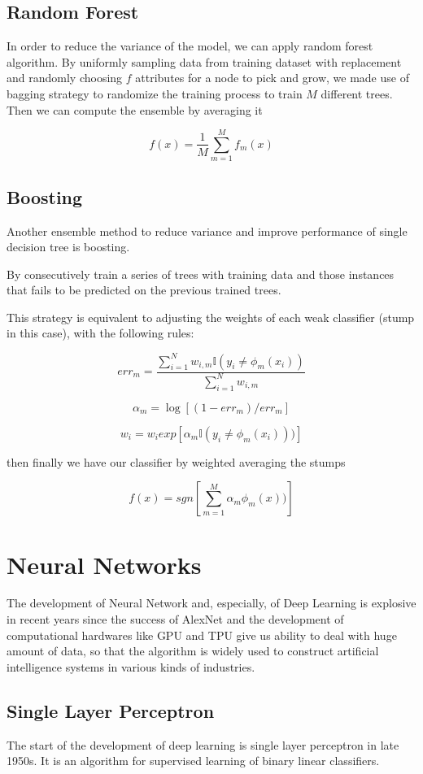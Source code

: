 \documentclass[10pt,twocolumn,letterpaper]{article}
\begin{document}
\subsection{Random Forest}
	In order to reduce the variance of the model, we can apply random forest algorithm. By uniformly sampling data from training dataset with replacement and randomly choosing $f$ attributes for a node to pick and grow, we made use of bagging strategy to randomize the training process to train $M$ different trees. Then we can compute the ensemble by averaging it
	
	\[f(x) = \frac{1}{M} \sum_{m = 1}^M  f_m(x)\]
	
\subsection{Boosting}
	Another ensemble method to reduce variance and improve performance of single decision tree is boosting.
	
	By consecutively train a series of trees with training data and those instances that fails to be predicted on the previous trained trees. 
	
	This strategy is equivalent to adjusting the weights of each weak classifier (stump in this case), with the following rules:
	
	\[err_m = \frac{\sum_{i = 1}^N w_{i,m} \mathbb{I}(y_i \neq \phi_m(x_i))}{\sum_{i = 1}^N w_{i,m}} \]
	
	\[\alpha_m = \log [(1 - err_m) / err_m]\]
	
	\[w_i = w_i exp[\alpha_m \mathbb{I}(y_i \neq \phi_m(x_i)))] \]
	
	then finally we have our classifier by weighted averaging the stumps
	
	\[f(x) = sgn\left[\sum_{m = 1}^M \alpha_m\phi_m(x)) \right]\]
	
\section{Neural Networks}
	The development of Neural Network and, especially, of Deep Learning is explosive in recent years since the success of AlexNet\cite{Krizhevsky:2012:ICD:2999134.2999257} and the development of computational hardwares like GPU and TPU give us ability to deal with huge amount of data, so that the algorithm is widely used to construct artificial intelligence systems in various kinds of industries.
	
\subsection{Single Layer Perceptron}
	The start of the development of deep learning is single layer perceptron in late 1950s\cite{freund1999large}. It is an algorithm for supervised learning of binary linear classifiers.
	
\end{document}
